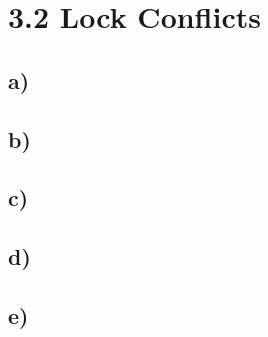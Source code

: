 \documentclass[ngerman]{dis-template-add}
\begin{document}




\section*{3.2 Lock Conflicts}

\subsection*{a)}

\subsection*{b)}

\subsection*{c)}

\subsection*{d)}

\subsection*{e)}
\end{document}
